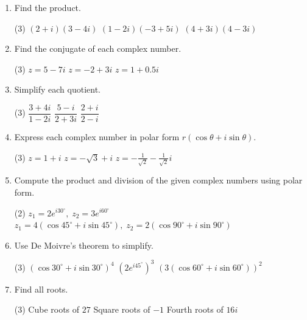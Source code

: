 \begin{enumerate}
\item Find the product.
\begin{tasks}[after-skip=60pt](3)
\task $(2 + i)(3 - 4i)$
\task $(1 - 2i)(-3 + 5i)$
\task $(4 + 3i)(4 - 3i)$
\end{tasks}

\item Find the conjugate of each complex number.
\begin{tasks}[after-skip=30pt](3)
\task $z = 5 - 7i$
\task $z = -2 + 3i$
\task $z = 1 + 0.5i$
\end{tasks}

\item Simplify each quotient.
\begin{tasks}[after-skip=60pt](3)
\task $\dfrac{3 + 4i}{1 - 2i}$
\task $\dfrac{5 - i}{2 + 3i}$
\task $\dfrac{2 + i}{2 - i}$
\end{tasks}


\item Express each complex number in polar form $r(\cos\theta + i\sin\theta)$.
\begin{tasks}[after-skip=60pt](3)
\task $z = 1 + i$
\task $z = -\sqrt{3} + i$
\task $z = -\frac{1}{\sqrt{2}} - \frac{1}{\sqrt{2}}i$
\end{tasks}


\item Compute the product and division of the given complex numbers using polar form.
\begin{tasks}[after-skip=60pt](2)
\task $z_1 = 2e^{i30^\circ},\; z_2 = 3e^{i60^\circ}$
\task $z_1 = 4(\cos45^\circ + i\sin45^\circ),\; z_2 = 2(\cos90^\circ + i\sin90^\circ)$
\end{tasks}

\item Use De Moivre's theorem to simplify.
\begin{tasks}[after-skip=30pt](3)
\task $(\cos30^\circ + i\sin30^\circ)^4$
\task $(2e^{i45^\circ})^3$
\task $(3(\cos60^\circ + i\sin60^\circ))^2$
\end{tasks}

\item Find all roots.
\begin{tasks}[after-skip=60pt](3)
\task Cube roots of $27$
\task Square roots of $-1$
\task Fourth roots of $16i$
\end{tasks}
 
\end{enumerate}